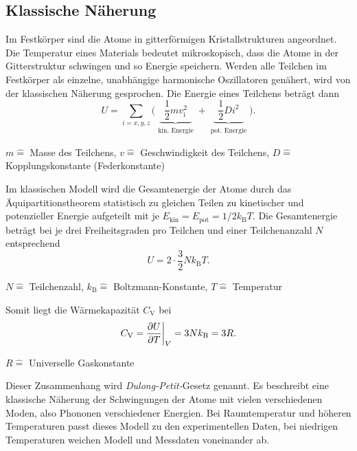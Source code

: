 \subsection{Klassische Näherung}
Im Festkörper sind die Atome in gitterförmigen Kristallstrukturen angeordnet.
Die Temperatur eines Materials bedeutet mikroskopisch, dass die Atome in der Gitterstruktur schwingen und so Energie speichern.
Werden alle Teilchen im Festkörper als einzelne, unabhängige harmonische Oszillatoren genähert, wird von der klassischen Näherung gesprochen.
Die Energie eines Teilchens beträgt dann
\begin{equation*}
	U = \sum_{i=x,y,z} \bigg( \underbrace{ \,\,\, \frac{1}{2}mv_{\text{i}}^2 \,\,\, }_{\substack{\text{kin. Energie}}} + \underbrace{ \,\,\, \frac{1}{2} D i^2 \,\,\, }_{\substack{\text{pot. Energie}}} \bigg).
\end{equation*}
\begin{center}
	\tiny{$m \widehat{=}$ Masse des Teilchens, $v \widehat{=}$ Geschwindigkeit des Teilchens, $D \widehat{=}$ Kopplungskonstante (Federkonstante)}
\end{center}
Im klassischen Modell wird die Gesamtenergie der Atome durch das Äquipartitionstheorem statistisch zu gleichen Teilen zu kinetischer und potenzieller Energie aufgeteilt mit je $E_{\text{kin}} = E_{\text{pot}} = 1/2 k_{\text{B}} T $.
Die Gesamtenergie beträgt bei je drei Freiheitsgraden pro Teilchen und einer Teilchenanzahl $N$ entsprechend
\begin{equation*}
	U = 2 \cdot \frac{3}{2} N k_{\text{B}} T.
\end{equation*}
\begin{center}
	\tiny{$N\widehat{=}$ Teilchenzahl, $k_{\text{B}} \widehat{=}$ Boltzmann-Konstante, $T \widehat{=}$ Temperatur}
\end{center}
Somit liegt die Wärmekapazität $C_{\text{V}}$ bei
\begin{equation}
	C_{\text{V}} = \frac{\partial U}{\partial T} \bigg{\vert}_{V} = 3 N k_{\text{B}} = 3 R.
	\label{eqn:dulongpetit}
\end{equation}
\begin{center}
	\tiny{$R \widehat{=}$ Universelle Gaskonstante}
\end{center}
Dieser Zusammenhang wird \textit{Dulong-Petit-}Gesetz genannt.
Es beschreibt eine klassische Näherung der Schwingungen der Atome mit vielen verschiedenen Moden, also Phononen verschiedener Energien.
Bei Raumtemperatur und höheren Temperaturen passt dieses Modell zu den experimentellen Daten, bei niedrigen Temperaturen weichen Modell und Messdaten voneinander ab.

